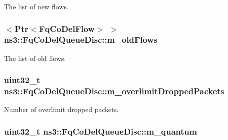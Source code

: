 The list of new flows. 

\subsubsection[{\texorpdfstring{m\+\_\+old\+Flows}{m_oldFlows}}]{$<${\bf Ptr}$<${\bf Fq\+Co\+Del\+Flow}$>$ $>$ ns3\+::\+Fq\+Co\+Del\+Queue\+Disc\+::m\+\_\+old\+Flows\hspace{0.3cm}{\ttfamily [private]}}\hypertarget{classns3_1_1FqCoDelQueueDisc_a025a35ed71b066c207dcc74afae8f215}{}\label{classns3_1_1FqCoDelQueueDisc_a025a35ed71b066c207dcc74afae8f215}


The list of old flows. 

\subsubsection[{\texorpdfstring{m\+\_\+overlimit\+Dropped\+Packets}{m_overlimitDroppedPackets}}]{\setlength{\rightskip}{0pt plus 5cm}uint32\+\_\+t ns3\+::\+Fq\+Co\+Del\+Queue\+Disc\+::m\+\_\+overlimit\+Dropped\+Packets\hspace{0.3cm}{\ttfamily [private]}}\hypertarget{classns3_1_1FqCoDelQueueDisc_ab68732cc8cac53970d8bb17dd92421b5}{}\label{classns3_1_1FqCoDelQueueDisc_ab68732cc8cac53970d8bb17dd92421b5}


Number of overlimit dropped packets. 

\subsubsection[{\texorpdfstring{m\+\_\+quantum}{m_quantum}}]{\setlength{\rightskip}{0pt plus 5cm}uint32\+\_\+t ns3\+::\+Fq\+Co\+Del\+Queue\+Disc\+::m\+\_\+quantum\hspace{0.3cm}{\ttfamily [private]}}\hypertarget{classns3_1_1FqCoDelQueueDisc_ad4638258d780533e28cb83f27fb63a6c}{}\label{classns3_1_1FqCoDelQueueDisc_ad4638258d780533e28cb83f27fb63a6c}


